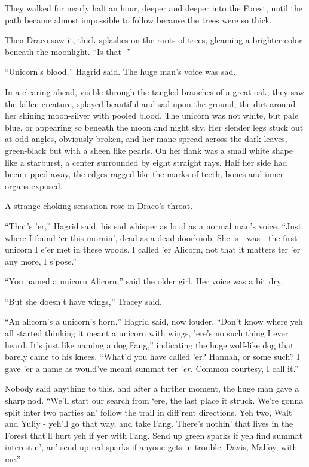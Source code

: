 They walked for nearly half an hour, deeper and deeper into the Forest,
until the path became almost impossible to follow because the trees were
so thick.

Then Draco saw it, thick splashes on the roots of trees, gleaming a
brighter color beneath the moonlight. ``Is that -''

``Unicorn's blood,'' Hagrid said. The huge man's voice was sad.

In a clearing ahead, visible through the tangled branches of a great
oak, they saw the fallen creature, splayed beautiful and sad upon the
ground, the dirt around her shining moon-silver with pooled blood. The
unicorn was not white, but pale blue, or appearing so beneath the moon
and night sky. Her slender legs stuck out at odd angles, obviously
broken, and her mane spread across the dark leaves, green-black but with
a sheen like pearls. On her flank was a small white shape like a
starburst, a center surrounded by eight straight rays. Half her side had
been ripped away, the edges ragged like the marks of teeth, bones and
inner organs exposed.

A strange choking sensation rose in Draco's throat.

``That's 'er,'' Hagrid said, his sad whisper as loud as a normal man's
voice. ``Just where I found `er this mornin', dead as a dead doorknob.
She is - was - the first unicorn I e'er met in these woods. I called 'er
Alicorn, not that it matters ter 'er any more, I s'pose.''

``You named a unicorn Alicorn,'' said the older girl. Her voice was a
bit dry.

``But she doesn't have wings,'' Tracey said.

``An alicorn's a unicorn's horn,'' Hagrid said, now louder. ``Don't know
where yeh all started thinking it meant a unicorn with wings, 'ere's no
such thing I ever heard. It's just like naming a dog Fang,'' indicating
the huge wolf-like dog that barely came to his knees. ``What'd you have
called 'er? Hannah, or some such? I gave 'er a name as would've meant
summat ter \emph{'er.} Common courtesy, I call it.''

Nobody said anything to this, and after a further moment, the huge man
gave a sharp nod. ``We'll start our search from `ere, the last place it
struck. We're gonna split inter two parties an' follow the trail in
diff'rent directions. Yeh two, Walt and Yuliy - yeh'll go that way, and
take Fang. There's nothin' that lives in the Forest that'll hurt yeh if
yer with Fang. Send up green sparks if yeh find summat interestin', an'
send up red sparks if anyone gets in trouble. Davis, Malfoy, with me.''

